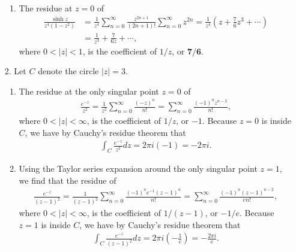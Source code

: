 \documentclass[a4paper,12pt]{article}
\begin{document}
\begin{enumerate}
\begin{enumerate}
            \item
                The residue at $z = 0$ of
                \begin{align*}
                    \frac{\sinh z}{z^4(1 - z^2)} &= \frac{1}{z^4} \sum_{n = 0}^\infty \frac{z^{2n + 1}}{(2n + 1)!} \sum_{n = 0}^\infty z^{2n} = \frac{1}{z^4} \left( z + \frac{7}{6} z^3 + \cdots \right) \\
                    &= \frac{1}{z^3} + \frac{7}{6z} + \cdots,
                \end{align*}
                where $0 < |z| < 1$, is the coefficient of $1/z$, or $\mathbf{7/6}$.
        \end{enumerate}

    \item[2.]
        Let $C$ denote the circle $|z| = 3$.
        \begin{enumerate}
            \item
                The residue at the only singular point $z = 0$ of
                \begin{align*}
                    \frac{e^{-z}}{z^2} = \frac{1}{z^2} \sum_{n = 0}^\infty \frac{(-z)^n}{n!} = \sum_{n = 0}^\infty \frac{(-1)^n z^{n - 2}}{n!},
                \end{align*}
                where $0 < |z| < \infty$, is the coefficient of $1/z$, or $-1$. Because $z = 0$ is inside $C$, we have by Cauchy's residue theorem that
                \begin{align*}
                    \int_C \frac{e^{-z}}{z^2} dz = 2\pi i(-1) = -2\pi i.
                \end{align*}

            \item
                Using the Taylor series expansion around the only singular point $z = 1$, we find that the residue of
                \begin{align*}
                    \frac{e^{-z}}{(z - 1)^2} = \frac{1}{(z - 1)^2} \sum_{n = 0}^\infty \frac{(-1)^n e^{-1} (z - 1)^n}{n!} = \sum_{n = 0}^\infty \frac{(-1)^n (z - 1)^{n - 2}}{e n!},
                \end{align*}
                where $0 < |z| < \infty$, is the coefficient of $1/(z - 1)$, or $-1/e$. Because $z = 1$ is inside $C$, we have by Cauchy's residue theorem that
                \begin{align*}
                    \int_C \frac{e^{-z}}{(z - 1)^2} dz = 2\pi i \left( -\frac{1}{e} \right) = -\frac{2\pi i}{e}.
                \end{align*}


\end{enumerate}
\end{enumerate}
\end{document}
